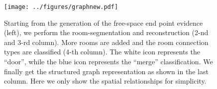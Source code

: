 \clearpage
\begin{figure}[!t]
  \centering
  \texttt{[image: ../figures/graphnew.pdf]}
  \caption{Starting from the generation of the free-space end point
  evidence (left), we perform the room-segmentation and reconstruction
  (2-nd and 3-rd column).  More rooms are added and the room connection
  types are classified (4-th column). The white icon represents the
  ``door'', while the blue icon represents the ``merge'' classification.
  We finally get the structured graph representation as shown in the
  last column. Here we only show the spatial relationships for
  simplicity. }
\end{figure}

\clearpage


